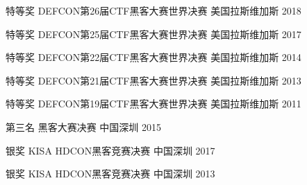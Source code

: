 



\begin{cvhonors}

  \cvhonor
    {特等奖} %
    {DEFCON第26届CTF黑客大赛世界决赛} %
    {美国拉斯维加斯} %
    {2018} %

  \cvhonor
    {特等奖} %
    {DEFCON第25届CTF黑客大赛世界决赛} %
    {美国拉斯维加斯} %
    {2017} %

  \cvhonor
    {特等奖} %
    {DEFCON第22届CTF黑客大赛世界决赛} %
    {美国拉斯维加斯} %
    {2014} %

  \cvhonor
    {特等奖} %
    {DEFCON第21届CTF黑客大赛世界决赛} %
    {美国拉斯维加斯} %
    {2013} %

  \cvhonor
    {特等奖} %
    {DEFCON第19届CTF黑客大赛世界决赛} %
    {美国拉斯维加斯} %
    {2011} %

\end{cvhonors}




\begin{cvhonors}

  \cvhonor
    {第三名} %
    {黑客大赛决赛} %
    {中国深圳} %
    {2015} %

  \cvhonor
    {银奖} %
    {KISA HDCON黑客竞赛决赛} %
    {中国深圳} %
    {2017} %

  \cvhonor
    {银奖} %
    {KISA HDCON黑客竞赛决赛} %
    {中国深圳} %
    {2013} %

\end{cvhonors}
